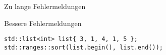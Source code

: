 \begin{frame}[fragile]{Zu lange Fehlermeldungen}

\end{frame}

\begin{frame}[fragile]{Bessere Fehlermeldungen}

    \begin{verbatim}
std::list<int> list{ 3, 1, 4, 1, 5 };
std::ranges::sort(list.begin(), list.end());
    \end{verbatim}
\end{frame}

